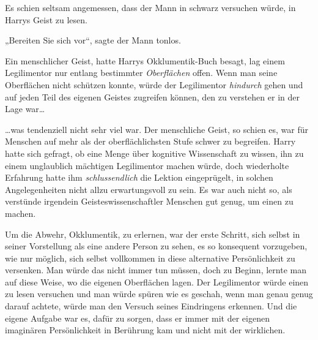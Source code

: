 Es schien seltsam angemessen, dass der Mann in schwarz versuchen würde, in Harrys Geist zu lesen.

„Bereiten Sie sich vor“, sagte der Mann tonlos.

Ein menschlicher Geist, hatte Harrys Okklumentik-Buch besagt, lag einem Legilimentor nur entlang bestimmter \emph{Oberflächen} offen. Wenn man seine Oberflächen nicht schützen konnte, würde der Legilimentor \emph{hindurch} gehen und auf jeden Teil des eigenen Geistes zugreifen können, den zu verstehen er in der Lage war…

…was tendenziell nicht sehr viel war. Der menschliche Geist, so schien es, war für Menschen auf mehr als der oberflächlichsten Stufe schwer zu begreifen. Harry hatte sich gefragt, ob eine Menge über kognitive Wissenschaft zu wissen, ihn zu einem unglaublich mächtigen Legilimentor machen würde, doch wiederholte Erfahrung hatte ihm \emph{schlussendlich} die Lektion eingeprügelt, in solchen Angelegenheiten nicht allzu erwartungsvoll zu sein. Es war auch nicht so, als verstünde irgendein Geisteswissenschaftler Menschen gut genug, um einen zu machen.

Um die Abwehr, Okklumentik, zu erlernen, war der erste Schritt, sich selbst in seiner Vorstellung als eine andere Person zu sehen, es so konsequent vorzugeben, wie nur möglich, sich selbst vollkommen in diese alternative Persönlichkeit zu versenken. Man würde das nicht immer tun müssen, doch zu Beginn, lernte man auf diese Weise, wo die eigenen Oberflächen lagen. Der Legilimentor würde einen zu lesen versuchen und man würde spüren wie es geschah, wenn man genau genug darauf achtete, würde man den Versuch seines Eindringens erkennen. Und die eigene Aufgabe war es, dafür zu sorgen, dass er immer mit der eigenen imaginären Persönlichkeit in Berührung kam und nicht mit der wirklichen.

